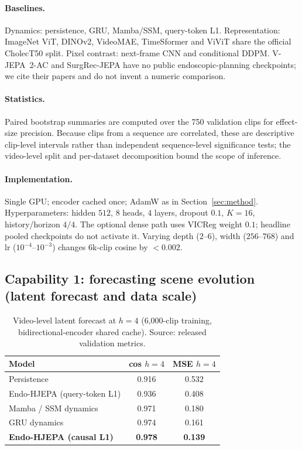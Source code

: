 \documentclass[preprint,12pt]{elsarticle}
\begin{document}
\paragraph{Baselines.}
Dynamics: persistence, GRU, Mamba/SSM, query-token L1.
Representation: ImageNet ViT, DINOv2, VideoMAE, TimeSformer and ViViT share
the official CholecT50 split.
Pixel contrast: next-frame CNN and conditional DDPM.
V-JEPA~2-AC and SurgRec-JEPA have no public endoscopic-planning checkpoints; we cite their papers and do not invent a numeric comparison.

\paragraph{Statistics.}
Paired bootstrap summaries are computed over the 750 validation clips for
effect-size precision. Because clips from a sequence are correlated, these are
descriptive clip-level intervals rather than independent sequence-level
significance tests; the video-level split and per-dataset decomposition bound
the scope of inference.

\paragraph{Implementation.}
Single GPU; encoder cached once; AdamW as in Section~\ref{sec:method}.
Hyperparameters: hidden $512$, $8$ heads, $4$ layers, dropout $0.1$,
$K{=}16$, history/horizon $4/4$. The optional dense path uses VICReg weight
$0.1$; headline pooled checkpoints do not activate it.
Varying depth ($2$--$6$), width ($256$--$768$) and lr ($10^{-4}$--$10^{-3}$) changes $6$k-clip cosine by ${<}0.002$.

\subsection{Capability 1: forecasting scene evolution (latent forecast and data scale)}
\label{sec:rq1}

\begin{table}[t]
\centering
\caption{Video-level latent forecast at $h{=}4$ (6{,}000-clip training,
bidirectional-encoder shared cache).
Source: released validation metrics.}
\label{tab:forecast}
\small
\begin{tabular}{lcc}
\toprule
Model & cos $h{=}4$ & MSE $h{=}4$ \\
\midrule
Persistence & 0.916 & 0.532 \\
Endo-HJEPA (query-token L1) & 0.936 & 0.408 \\
Mamba / SSM dynamics & 0.971 & 0.180 \\
GRU dynamics & 0.974 & 0.161 \\
\textbf{Endo-HJEPA (causal L1)} & \textbf{0.978} & \textbf{0.139} \\
\bottomrule
\end{tabular}
\end{table}
\end{document}
